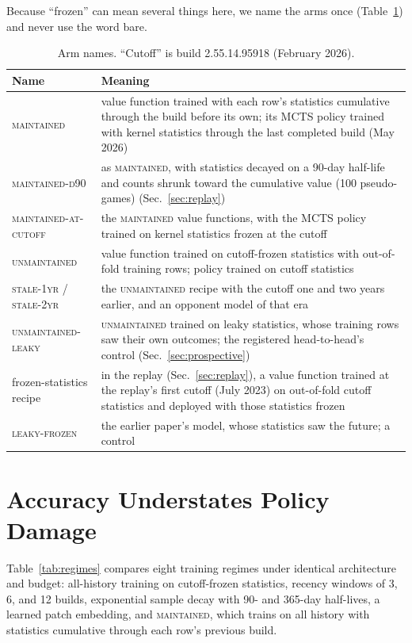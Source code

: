 \documentclass[journal]{IEEEtran}
\newcommand{\maintained}{\textsc{maintained}}          %
\newcommand{\maintainedpred}{\textsc{maintained-d90}}  %
\newcommand{\mcut}{\textsc{maintained-at-cutoff}}      %
\newcommand{\stalefour}{\textsc{unmaintained}}          %
\newcommand{\leakyunm}{\textsc{unmaintained-leaky}}     %
\newcommand{\staleone}{\textsc{stale-1yr}}
\newcommand{\staletwo}{\textsc{stale-2yr}}
\newcommand{\leakyfrozen}{\textsc{leaky-frozen}}
\begin{document}
Because ``frozen'' can mean several things here, we name the arms once
(Table~\ref{tab:names}) and never use the word bare.

\begin{table}[t]
\caption{Arm names. ``Cutoff'' is build 2.55.14.95918 (February 2026).}
\label{tab:names}
\centering
\small
\setlength{\tabcolsep}{4pt}
\begin{tabular}{@{}p{}p{}@{}}
\toprule
Name & Meaning \\
\midrule
\maintained{} & value function trained with each row's statistics cumulative through the build before its own; its MCTS policy trained with kernel statistics through the last completed build (May 2026) \\
\maintainedpred{} & as \maintained{}, with statistics decayed on a 90-day half-life and counts shrunk toward the cumulative value (100 pseudo-games) (Sec.~\ref{sec:replay}) \\
\mcut{} & the \maintained{} value functions, with the MCTS policy trained on kernel statistics frozen at the cutoff \\
\stalefour{} & value function trained on cutoff-frozen statistics with out-of-fold training rows; policy trained on cutoff statistics \\
\staleone{} / \staletwo{} & the \stalefour{} recipe with the cutoff one and two years earlier, and an opponent model of that era \\
\leakyunm{} & \stalefour{} trained on leaky statistics, whose training rows saw their own outcomes; the registered head-to-head's control (Sec.~\ref{sec:prospective}) \\
frozen-statistics recipe & in the replay (Sec.~\ref{sec:replay}), a value function trained at the replay's first cutoff (July 2023) on out-of-fold cutoff statistics and deployed with those statistics frozen \\
\leakyfrozen{} & the earlier paper's model, whose statistics saw the future; a control \\
\bottomrule
\end{tabular}
\end{table}

\section{Accuracy Understates Policy Damage}
\label{sec:hidden}

Table~\ref{tab:regimes} compares eight training regimes under identical
architecture and budget: all-history training on cutoff-frozen
statistics, recency windows of 3, 6, and 12 builds, exponential sample
decay with 90- and 365-day half-lives, a learned patch embedding, and
\maintained{}, which trains on all history with statistics cumulative
through each row's previous build.
\end{document}
